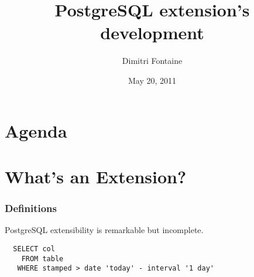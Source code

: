 \documentclass[english]{beamer}
\title{PostgreSQL extension's development}
\author{Dimitri Fontaine}
\date{May 20, 2011}
\begin{document}
\frame{\titlepage}

\section*{Agenda}

\section{What's an Extension?}

\begin{frame}[fragile]
  \frametitle{Definitions}

  \begin{center}
    PostgreSQL extensibility is remarkable but incomplete. 
  \end{center}

\begin{example}
\begin{verbatim}
  SELECT col
    FROM table
   WHERE stamped > date 'today' - interval '1 day'
\end{verbatim}
\end{example}
\end{frame}
\end{document}
